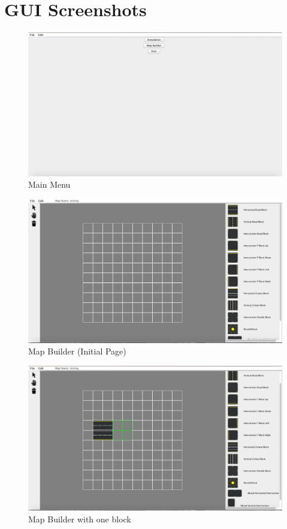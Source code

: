 \newpage
\section*{GUI Screenshots} %


\begin{figure}[h2] 
\centering \includegraphics[width=6in]{img1}
\caption{Main Menu} 
\end{figure}

\begin{figure}[h2] 
\centering \includegraphics[width=6in]{img2}
\caption{Map Builder (Initial Page)} 
\end{figure}

\begin{figure}[h2] 
\centering \includegraphics[width=6in]{img3}
\caption{Map Builder with one block} 
\end{figure}

